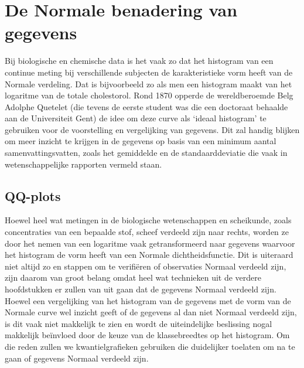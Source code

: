 \documentclass[
  12pt,dutch,coursenotes]{book}
\theoremstyle{definition}
\theoremstyle{definition}
\theoremstyle{definition}
\theoremstyle{remark}
\begin{document}
\hypertarget{sec:normal}{%
\section{De Normale benadering van gegevens}\label{sec:normal}}

Bij biologische en chemische data is het vaak zo dat het histogram van een continue
meting bij verschillende subjecten de karakteristieke vorm heeft van de
Normale verdeling. Dat is bijvoorbeeld zo als men een histogram maakt van het
logaritme van de totale cholestorol. Rond 1870 opperde de wereldberoemde
Belg Adolphe Quetelet (die tevens de eerste student was die een doctoraat behaalde aan de Universiteit
Gent) de idee om deze curve als `ideaal histogram' te gebruiken voor de
voorstelling en vergelijking van gegevens. Dit zal handig blijken om meer
inzicht te krijgen in de gegevens op basis van een minimum aantal
samenvattingsvatten, zoals het gemiddelde en de standaarddeviatie die vaak
in wetenschappelijke rapporten vermeld staan.

\hypertarget{sec:qq}{%
\subsection{QQ-plots}\label{sec:qq}}

Hoewel heel wat metingen in de biologische wetenschappen en scheikunde, zoals
concentraties van een bepaalde stof, scheef verdeeld zijn naar rechts,
worden ze door het nemen van een logaritme vaak getransformeerd naar
gegevens waarvoor het histogram de vorm heeft van een Normale dichtheidsfunctie.
Dit is uiteraard niet altijd zo en stappen om te verifiëren of observaties
Normaal verdeeld zijn, zijn daarom van groot belang omdat heel wat technieken uit de verdere hoofdstukken er zullen van uit gaan dat de
gegevens Normaal verdeeld zijn. Hoewel een vergelijking van het histogram
van de gegevens met de vorm van de Normale curve wel inzicht geeft of de
gegevens al dan niet Normaal verdeeld zijn, is dit vaak niet makkelijk te
zien en wordt de uiteindelijke beslissing nogal makkelijk beïnvloed door de keuze
van de klassebreedtes op het histogram. Om die reden zullen we
kwantielgrafieken gebruiken die duidelijker toelaten om na te gaan of
gegevens Normaal verdeeld zijn.
\end{document}
